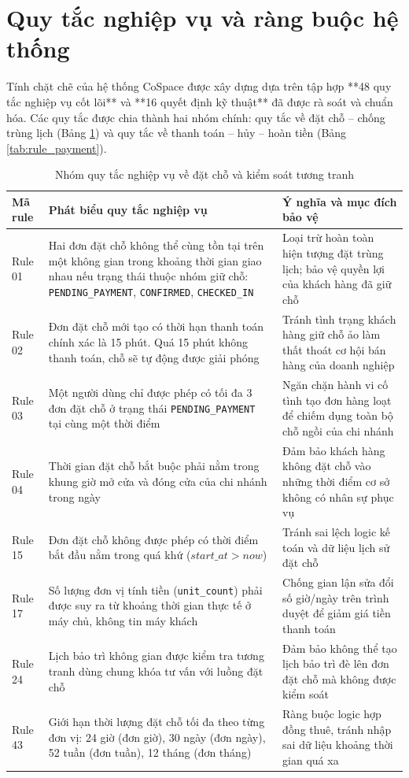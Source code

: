 \section{Quy tắc nghiệp vụ và ràng buộc hệ thống}
\label{sec:quytac}

Tính chặt chẽ của hệ thống CoSpace được xây dựng dựa trên tập hợp **48 quy tắc nghiệp vụ cốt lõi** và **16 quyết định kỹ thuật** đã được rà soát và chuẩn hóa. Các quy tắc được chia thành hai nhóm chính: quy tắc về đặt chỗ -- chống trùng lịch (Bảng \ref{tab:rule_booking}) và quy tắc về thanh toán -- hủy -- hoàn tiền (Bảng \ref{tab:rule_payment}).

\begin{table}[H]
\centering
\caption{Nhóm quy tắc nghiệp vụ về đặt chỗ và kiểm soát tương tranh}
\label{tab:rule_booking}
\small
\renewcommand{\arraystretch}{1.25}
\begin{tabular}{|p{1.4cm}|p{7.4cm}|p{5.6cm}|}
\hline
\textbf{Mã rule} & \textbf{Phát biểu quy tắc nghiệp vụ} & \textbf{Ý nghĩa và mục đích bảo vệ} \\
\hline
Rule 01 & Hai đơn đặt chỗ không thể cùng tồn tại trên một không gian trong khoảng thời gian giao nhau nếu trạng thái thuộc nhóm giữ chỗ: \texttt{PENDING\_PAYMENT}, \texttt{CONFIRMED}, \texttt{CHECKED\_IN} & Loại trừ hoàn toàn hiện tượng đặt trùng lịch; bảo vệ quyền lợi của khách hàng đã giữ chỗ \\
\hline
Rule 02 & Đơn đặt chỗ mới tạo có thời hạn thanh toán chính xác là 15 phút. Quá 15 phút không thanh toán, chỗ sẽ tự động được giải phóng & Tránh tình trạng khách hàng giữ chỗ ảo làm thất thoát cơ hội bán hàng của doanh nghiệp \\
\hline
Rule 03 & Một người dùng chỉ được phép có tối đa 3 đơn đặt chỗ ở trạng thái \texttt{PENDING\_PAYMENT} tại cùng một thời điểm & Ngăn chặn hành vi cố tình tạo đơn hàng loạt để chiếm dụng toàn bộ chỗ ngồi của chi nhánh \\
\hline
Rule 04 & Thời gian đặt chỗ bắt buộc phải nằm trong khung giờ mở cửa và đóng cửa của chi nhánh trong ngày & Đảm bảo khách hàng không đặt chỗ vào những thời điểm cơ sở không có nhân sự phục vụ \\
\hline
Rule 15 & Đơn đặt chỗ không được phép có thời điểm bắt đầu nằm trong quá khứ ($start\_at > now$) & Tránh sai lệch logic kế toán và dữ liệu lịch sử đặt chỗ \\
\hline
Rule 17 & Số lượng đơn vị tính tiền (\texttt{unit\_count}) phải được suy ra từ khoảng thời gian thực tế ở máy chủ, không tin máy khách & Chống gian lận sửa đổi số giờ/ngày trên trình duyệt để giảm giá tiền thanh toán \\
\hline
Rule 24 & Lịch bảo trì không gian được kiểm tra tương tranh dùng chung khóa tư vấn với luồng đặt chỗ & Đảm bảo không thể tạo lịch bảo trì đè lên đơn đặt chỗ mà không được kiểm soát \\
\hline
Rule 43 & Giới hạn thời lượng đặt chỗ tối đa theo từng đơn vị: 24 giờ (đơn giờ), 30 ngày (đơn ngày), 52 tuần (đơn tuần), 12 tháng (đơn tháng) & Ràng buộc logic hợp đồng thuê, tránh nhập sai dữ liệu khoảng thời gian quá xa \\
\hline
\end{tabular}
\end{table}

